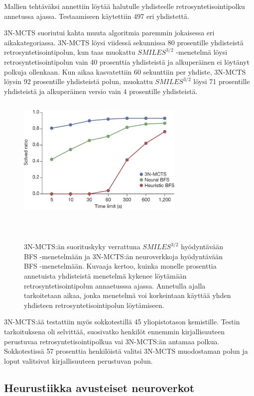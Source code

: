 \documentclass[finnish,twoside,censored,tkt,sw-line]{HYthesisML}
\begin{document}
Mallien tehtäväksi annettiin löytää halutulle yhdisteelle retrosyntetisointipolku annetussa ajassa.
Testaamiseen käytettiin 497 eri yhdistettä.

3N-MCTS suoriutui kahta muuta algoritmia paremmin jokaisessa eri aikakategoriassa.
3N-MCTS löysi viidessä sekunnissa 80 prosentille yhdisteistä retrosyntetisointipolun, kun taas muokattu \(SMILES^{3/2}\) -menetelmä löysi retrosyntetisointipolun vain 40 prosenttia yhdisteistä ja alkuperäinen ei löytänyt polkuja ollenkaan.
Kun aikaa kasvatettiin 60 sekunttiin per yhdiste, 3N-MCTS löysin 92 prosentille yhdisteistä polun, muokattu \(SMILES^{3/2}\) löysi 71 prosentille yhdisteistä ja alkuperäinen versio vain 4 prosentille yhdisteistä.

\begin{figure}[ht]
    \centering
    \includegraphics[width=8cm, height=6cm]{3N-MCTS-performance-fig.jpg}
    \caption{
        3N-MCTS:än suorituskyky verrattuna \(SMILES^{3/2}\) hyödyntävään BFS -menetelmään ja 3N-MCTS:än neuroverkkoja hyödyntävään BFS -menetelmään.
        Kuvaaja kertoo, kuinka monelle prosenttia annetuista yhdisteistä menetelmä kykenee löytämään retrosyntetisointipolun annaetusssa ajassa.
        Annetulla ajalla tarkoitetaan aikaa, jonka menetelmä voi korkeintaan käyttää yhden yhdisteen retrosyntetisointipolun löytämiseen.
    }
    {~\cite{SeglerMarwinHS2018Pcsw}}
\end{figure}

3N-MCTS:ää testattiin myös sokkotestillä 45 yliopistotason kemistille.
Testin tarkoituksena oli selvittää, suosivatko henkilöt ennemmin kirjallisuuteen perustuvaa retrosyntetisointipolkua vai 3N-MCTS:än antamaa polkua.
Sokkotestissä 57 prosenttia henkilöistä valitsi 3N-MCTS muodostaman polun ja loput valitsivat kirjallisuuteen perustuvan polun.


\subsection{Heurustiikka avusteiset neuroverkot}
\end{document}
